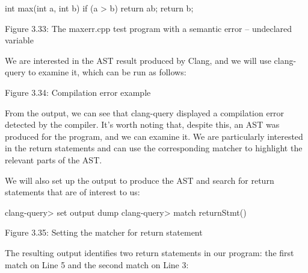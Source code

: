 \begin{cpp}
int max(int a, int b) {
  if (a > b) {
    return ab;
  }
  return b;
}
\end{cpp}

\begin{center}
Figure 3.33: The maxerr.cpp test program with a semantic error – undeclared variable
\end{center}

We are interested in the AST result produced by Clang, and we will use clang-query to examine it, which can be run as follows:


\begin{center}
Figure 3.34: Compilation error example
\end{center}

From the output, we can see that clang-query displayed a compilation error detected by the compiler. It’s worth noting that, despite this, an AST was produced for the program, and we can examine it. We are particularly interested in the return statements and can use the corresponding matcher to highlight the relevant parts of the AST.

We will also set up the output to produce the AST and search for return statements that are of interest to us:

\begin{shell}
clang-query> set output dump
clang-query> match returnStmt()
\end{shell}

\begin{center}
Figure 3.35: Setting the matcher for return statement
\end{center}

The resulting output identifies two return statements in our program: the first match on Line 5 and the second match on Line 3:


